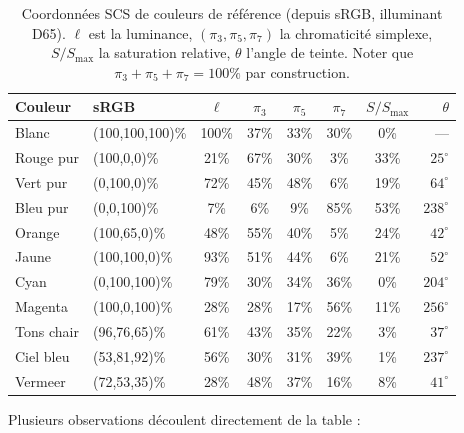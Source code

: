 \documentclass[12pt,a4paper]{article}
\begin{document}
\begin{table}[ht]
\centering
\caption{Coordonn\'ees SCS de couleurs de r\'ef\'erence (depuis sRGB,
illuminant D65). $\ell$ est la luminance, $(\pi_3, \pi_5, \pi_7)$ la
chromaticit\'e simplexe, $S/S_{\max}$ la saturation relative, $\theta$
l'angle de teinte. Noter que $\pi_3 + \pi_5 + \pi_7 = 100\%$ par
construction.}
\label{tab:ref_colors}
\small
\begin{tabular}{llcccccr}
\toprule
Couleur & sRGB & $\ell$ & $\pi_3$ & $\pi_5$ & $\pi_7$ & $S/S_{\max}$ & $\theta$ \\
\midrule
Blanc        & (100,100,100)\% & 100\% & 37\% & 33\% & 30\% & 0\%  & --- \\
Rouge pur    & (100,0,0)\%     & 21\%  & 67\% & 30\% & 3\%  & 33\% & $25^\circ$ \\
Vert pur     & (0,100,0)\%     & 72\%  & 45\% & 48\% & 6\%  & 19\% & $64^\circ$ \\
Bleu pur     & (0,0,100)\%     & 7\%   & 6\%  & 9\%  & 85\% & 53\% & $238^\circ$ \\
Orange       & (100,65,0)\%    & 48\%  & 55\% & 40\% & 5\%  & 24\% & $42^\circ$ \\
Jaune        & (100,100,0)\%   & 93\%  & 51\% & 44\% & 6\%  & 21\% & $52^\circ$ \\
Cyan         & (0,100,100)\%   & 79\%  & 30\% & 34\% & 36\% & 0\%  & $204^\circ$ \\
Magenta      & (100,0,100)\%   & 28\%  & 28\% & 17\% & 56\% & 11\% & $256^\circ$ \\
Tons chair   & (96,76,65)\%    & 61\%  & 43\% & 35\% & 22\% & 3\%  & $37^\circ$ \\
Ciel bleu    & (53,81,92)\%    & 56\%  & 30\% & 31\% & 39\% & 1\%  & $237^\circ$ \\
Vermeer      & (72,53,35)\%    & 28\%  & 48\% & 37\% & 16\% & 8\%  & $41^\circ$ \\
\bottomrule
\end{tabular}
\end{table}

Plusieurs observations d\'ecoulent directement de la table :
\end{document}
